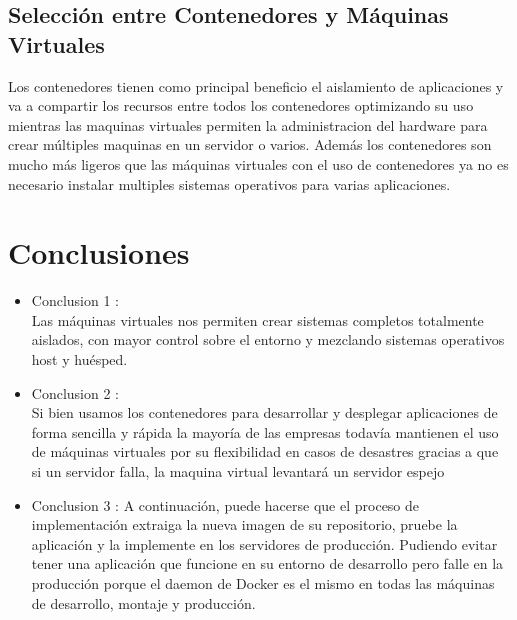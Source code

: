 \documentclass[preprint,12pt]{elsarticle}
\begin{document}
\subsection{\textbf{Selección entre Contenedores y Máquinas Virtuales}}
Los contenedores tienen como principal beneficio el aislamiento de aplicaciones y va a compartir los recursos entre todos los contenedores optimizando su uso mientras las maquinas virtuales permiten la administracion del hardware para crear múltiples maquinas en un servidor o varios. Además los contenedores son mucho más ligeros que las máquinas virtuales con el uso de contenedores ya no es necesario instalar multiples sistemas operativos para varias aplicaciones.




\section{Conclusiones}

\begin{itemize}

\item Conclusion 1 : \\ Las máquinas virtuales nos permiten crear sistemas completos totalmente aislados, con mayor control sobre el entorno y mezclando sistemas operativos host y huésped. 

\item Conclusion 2 : \\ Si bien usamos los contenedores para desarrollar y desplegar aplicaciones de forma sencilla y rápida la mayoría de las empresas todavía mantienen el uso de máquinas virtuales por su flexibilidad en casos de desastres gracias a que si un servidor falla, la maquina virtual levantará un servidor espejo

\item Conclusion 3 :
A continuación, puede hacerse que el proceso de implementación extraiga la nueva imagen de su repositorio, pruebe la aplicación y la implemente en los servidores de producción. Pudiendo evitar tener una aplicación que funcione en su entorno de desarrollo pero falle en la producción porque el daemon de Docker es el mismo en todas las máquinas de desarrollo, montaje y producción.
\end{itemize}


	
	\newpage
	
	 
		 
	
\end{document}
